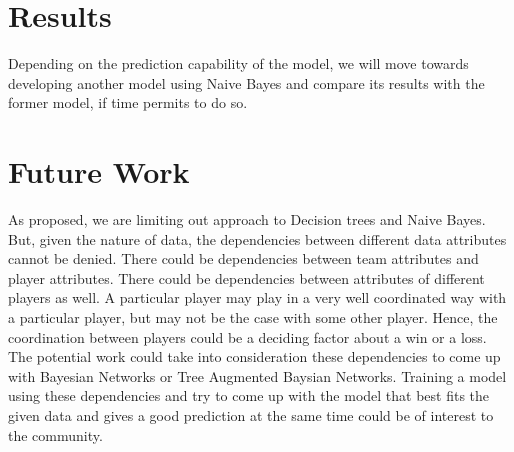 \documentclass[11pt, letterpaper]{article}
\begin{document}
\section*{Results}
Depending on the prediction capability of the model, we will move towards developing another model using Naive Bayes and compare its results with the former model, if time permits to do so. 

\section*{Future Work}
As proposed, we are limiting out approach to Decision trees and Naive Bayes. 
But, given the nature of data, the dependencies between different data attributes cannot be denied. There could be dependencies between team attributes and player attributes. 
There could be dependencies between attributes of different players as well. 
A particular player may play in a very well coordinated way with a particular player, but may not be the case with some other player. 
Hence, the coordination between players could be a deciding factor about a win or a loss. 
\newline
\\
The potential work could take into consideration these dependencies to come up with Bayesian Networks or Tree Augmented Baysian Networks. 
Training a model using these dependencies and try to come up with the model that best fits the given data and gives a good prediction at the same time could be of interest to the community.
\end{document}
